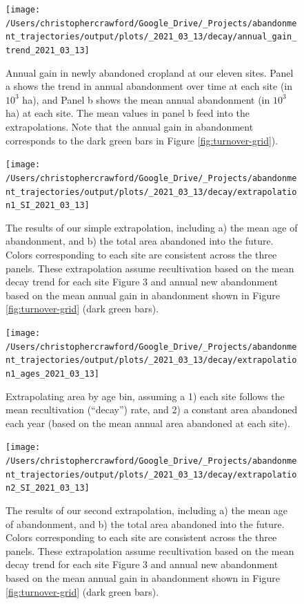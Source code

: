 \documentclass[
]{article}
\begin{document}
\begin{figure}
\texttt{[image: /Users/christophercrawford/Google\_Drive/\_Projects/abandonment\_trajectories/output/plots/\_2021\_03\_13/decay/annual\_gain\_trend\_2021\_03\_13]} \caption{Annual gain in newly abandoned cropland at our eleven sites. Panel a shows the trend in annual abandonment over time at each site (in \(10^3\) ha), and Panel b shows the mean annual abandonment (in \(10^3\) ha) at each site. The mean values in panel b feed into the extrapolations. Note that the annual gain in abandonment corresponds to the dark green bars in Figure \ref{fig:turnover-grid}).}\label{fig:annual-gain-trend}
\end{figure}



\begin{figure}
\texttt{[image: /Users/christophercrawford/Google\_Drive/\_Projects/abandonment\_trajectories/output/plots/\_2021\_03\_13/decay/extrapolation1\_SI\_2021\_03\_13]} \caption{The results of our simple extrapolation, including a) the mean age of abandonment, and b) the total area abandoned into the future. Colors corresponding to each site are consistent across the three panels. These extrapolation assume recultivation based on the mean decay trend for each site Figure 3 and annual new abandonment based on the mean annual gain in abandonment shown in Figure \ref{fig:turnover-grid} (dark green bars).}\label{fig:extrapolation-combo}
\end{figure}



\begin{figure}
\texttt{[image: /Users/christophercrawford/Google\_Drive/\_Projects/abandonment\_trajectories/output/plots/\_2021\_03\_13/decay/extrapolation1\_ages\_2021\_03\_13]} \caption{Extrapolating area by age bin, assuming a 1) each site follows the mean recultivation (``decay'') rate, and 2) a constant area abandoned each year (based on the mean annual area abandoned at each site).}\label{fig:extrapolation-area-by-age}
\end{figure}



\begin{figure}
\texttt{[image: /Users/christophercrawford/Google\_Drive/\_Projects/abandonment\_trajectories/output/plots/\_2021\_03\_13/decay/extrapolation2\_SI\_2021\_03\_13]} \caption{The results of our second extrapolation, including a) the mean age of abandonment, and b) the total area abandoned into the future. Colors corresponding to each site are consistent across the three panels. These extrapolation assume recultivation based on the mean decay trend for each site Figure 3 and annual new abandonment based on the mean annual gain in abandonment shown in Figure \ref{fig:turnover-grid} (dark green bars).}\label{fig:extrapolation2-combo}
\end{figure}
\end{document}
